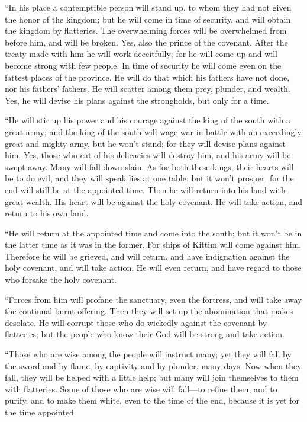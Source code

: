  ``In his place a contemptible person will stand up, to
whom they had not given the honor of the kingdom; but he will come in
time of security, and will obtain the kingdom by flatteries.
 The overwhelming forces will be overwhelmed from before
him, and will be broken. Yes, also the prince of the covenant.
 After the treaty made with him he will work deceitfully;
for he will come up and will become strong with few people.
 In time of security he will come even on the fattest
places of the province. He will do that which his fathers have not done,
nor his fathers' fathers. He will scatter among them prey, plunder, and
wealth. Yes, he will devise his plans against the strongholds, but only
for a time.

 ``He will stir up his power and his courage against the
king of the south with a great army; and the king of the south will wage
war in battle with an exceedingly great and mighty army, but he won't
stand; for they will devise plans against him.  Yes, those
who eat of his delicacies will destroy him, and his army will be swept
away. Many will fall down slain.  As for both these kings,
their hearts will be to do evil, and they will speak lies at one table;
but it won't prosper, for the end will still be at the appointed time.
 Then he will return into his land with great wealth. His
heart will be against the holy covenant. He will take action, and return
to his own land.

 ``He will return at the appointed time and come into the
south; but it won't be in the latter time as it was in the former.
 For ships of Kittim will come against him. Therefore he
will be grieved, and will return, and have indignation against the holy
covenant, and will take action. He will even return, and have regard to
those who forsake the holy covenant.

 ``Forces from him will profane the sanctuary, even the
fortress, and will take away the continual burnt offering. Then they
will set up the abomination that makes desolate.  He will
corrupt those who do wickedly against the covenant by flatteries; but
the people who know their God will be strong and take action.

 ``Those who are wise among the people will instruct many;
yet they will fall by the sword and by flame, by captivity and by
plunder, many days.  Now when they fall, they will be
helped with a little help; but many will join themselves to them with
flatteries.  Some of those who are wise will fall---to
refine them, and to purify, and to make them white, even to the time of
the end, because it is yet for the time appointed.

